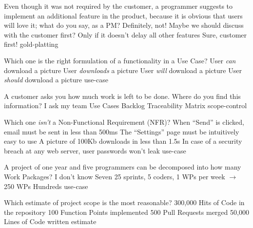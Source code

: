 \documentclass{article}
\begin{document}


\pmbaQuestion
  {Even though it was not required by the customer, a programmer suggests to implement an additional feature in the product, because it is obvious that users will love it; what do you say, as a PM?}
  {Definitely, not!}
  {Maybe we should discuss with the customer first?}
  {Only if it doesn't delay all other features}
  {Sure, customer first!}
  {gold-platting}

\pmbaQuestion
  {Which one is the right formulation of a functionality in a Use Case?}
  {User \emph{can} download a picture}
  {User \emph{downloads} a picture}
  {User \emph{will} download a picture}
  {User \emph{should} download a picture}
  {use-case}

\pmbaQuestion
  {A customer asks you how much work is left to be done. Where do you find this information?}
  {I ask my team}
  {Use Cases}
  {Backlog}
  {Traceability Matrix}
  {scope-control}

\pmbaQuestion
  {Which one \emph{isn't} a Non-Functional Requirement (NFR)?}
  {When ``Send'' is clicked, email must be sent in less than 500ms}
  {The ``Settings'' page must be intuitively easy to use}
  {A picture of 100Kb downloads in less than 1.5s}
  {In case of a security breach at any web server, user passwords won't leak}
  {use-case}

\pmbaQuestion
  {A project of one year and five programmers can be decomposed into how many Work Packages?}
  {I don't know}
  {Seven}
  {25 sprints, 5 coders, 1 WPs per week \(\to\) 250 WPs}
  {Hundreds}
  {use-case}

\pmbaQuestion
  {Which estimate of project scope is the most reasonable?}
  {300,000 Hits of Code in the repository}
  {100 Function Points implemented}
  {500 Pull Requests merged}
  {50,000 Lines of Code written}
  {estimate}

\end{document}
